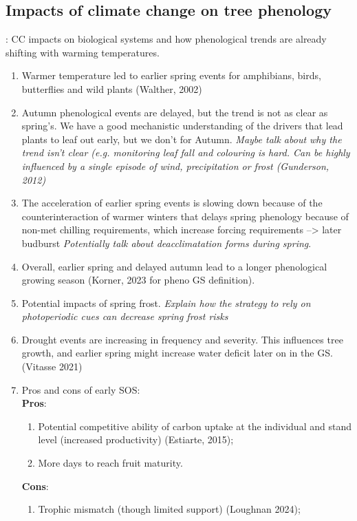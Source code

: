 \documentclass{article}
\begin{document}
\subsection *{Impacts of climate change on tree phenology} : CC impacts on biological systems and how phenological trends are already shifting with warming temperatures. 
\begin{enumerate}
\item Warmer temperature led to earlier spring events for amphibians, birds, butterflies and wild plants (Walther, 2002)
\item Autumn phenological events are delayed, but the trend is not as clear as spring's. We have a good mechanistic understanding of the drivers that lead plants to leaf out early, but we don't for Autumn. \textit{Maybe talk about why the trend isn't clear (e.g. monitoring leaf fall and colouring is hard. Can be highly influenced by a single episode of wind, precipitation or frost (Gunderson, 2012)}  
\item The acceleration of earlier spring events is slowing down because of the counterinteraction of warmer winters that delays spring phenology because of non-met chilling requirements, which increase forcing requirements --> later budburst \textit{Potentially talk about deacclimatation forms during spring}. 
\item Overall, earlier spring and delayed autumn lead to a longer phenological growing season (Korner, 2023 for pheno GS definition).
\item Potential impacts of spring frost. \textit{Explain how the strategy to rely on photoperiodic cues can decrease spring frost risks}
\item Drought events are increasing in frequency and severity. This influences tree growth, and earlier spring might increase water deficit later on in the GS. (Vitasse 2021)
\item Pros and cons of early SOS: \\ 
\textbf{Pros}: 
	\begin {enumerate}
		\item Potential competitive ability of carbon uptake at the individual and stand level (increased productivity) (Estiarte, 2015); 
		\item More days to reach fruit maturity. 
	\end {enumerate}
\textbf{Cons}: 
	\begin {enumerate}
		\item Trophic mismatch (though limited support) (Loughnan 2024); 

\end{enumerate}
\end{enumerate}
\end{document}
